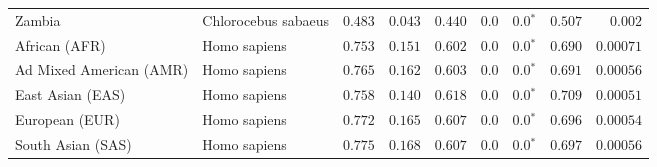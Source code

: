 \begin{center}
\begin{adjustbox}{width = 1\textwidth}
\begin{tabular}{|l|l|r|r|r|r|r|r|r|}
            Zambia        & Chlorocebus sabaeus        & $ 0.483$ & $ 0.043$ & $ 0.440$ & $0.0$    & $\bm{0.0{^*}}$ & $ 0.507$ & $ 0.002$ \\
            African (AFR)               & Homo sapiens        & $ 0.753$ & $ 0.151$ & $ 0.602$ & $0.0$    & $\bm{0.0{^*}}$    & $ 0.690$ & $0.00071$ \\
            Ad Mixed American (AMR)                 & Homo sapiens        & $ 0.765$ & $ 0.162$ & $ 0.603$ & $0.0$    & $\bm{0.0{^*}}$    & $ 0.691$ & $0.00056$ \\
            East Asian (EAS)              & Homo sapiens        & $ 0.758$ & $ 0.140$ & $ 0.618$ & $0.0$    & $\bm{0.0{^*}}$    & $ 0.709$ & $0.00051$ \\
            European (EUR)              & Homo sapiens        & $ 0.772$ & $ 0.165$ & $ 0.607$ & $0.0$    & $\bm{0.0{^*}}$    & $ 0.696$ & $0.00054$ \\
            South Asian (SAS)              & Homo sapiens        & $ 0.775$ & $ 0.168$ & $ 0.607$ & $0.0$    & $\bm{0.0{^*}}$    & $ 0.697$ & $0.00056$ \\
            \bottomrule
        \end{tabular}
    \end{adjustbox}
\end{center}